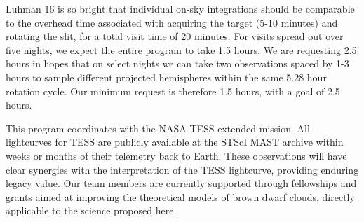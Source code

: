 \documentclass[11pt]{article}
\begin{document}
{Luhman 16 is so bright that individual on-sky integrations should be comparable to the overhead time  associated with acquiring the target (5-10 minutes) and rotating the slit, for a total visit time of 20 minutes.  For visits spread out over five nights, we expect the entire program to take 1.5 hours.  We are requesting 2.5 hours in hopes that on select nights we can take two observations spaced by 1-3 hours to sample different projected hemispheres within the same 5.28 hour rotation cycle.  Our minimum request is therefore 1.5 hours, with a goal of 2.5 hours.



%



%
%
%

\otherfacilities
This program coordinates with the NASA TESS extended mission.  All lightcurves for TESS are publicly available at the STScI MAST archive within weeks or months of their telemetry back to Earth.  These observations will have clear synergies with the interpretation of the TESS lightcurve, providing enduring legacy value.  Our team members are currently supported through fellowships and grants aimed at improving the theoretical models of brown dwarf clouds, directly applicable to the science proposed here.  

}
\end{document}
